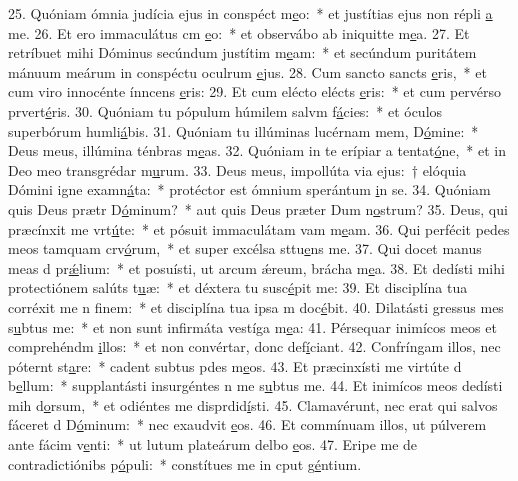 25. Quóniam ómnia judícia ejus in conspéct m\uline{e}o:~* et justítias ejus non répli \uline{a} me.
26. Et ero immaculátus cm \uline{e}o:~* et observábo ab iniquitte m\uline{e}a.
27. Et retríbuet mihi Dóminus secúndum justítim m\uline{e}am:~* et secúndum puritátem mánuum meárum in conspéctu oculrum \uline{e}jus.
28. Cum sancto sancts \uline{e}ris,~* et cum viro innocénte ínncens \uline{e}ris:
29. Et cum elécto elécts \uline{e}ris:~* et cum pervérso prvert\uline{é}ris.
30. Quóniam tu pópulum húmilem salvm f\uline{á}cies:~* et óculos superbórum humli\uline{á}bis.
31. Quóniam tu illúminas lucérnam mem, D\uline{ó}mine:~* Deus meus, illúmina ténbras m\uline{e}as.
32. Quóniam in te erípiar a tentat\uline{ó}ne,~* et in Deo meo transgrédar m\uline{u}rum.
33. Deus meus, impollúta via ejus:~† elóquia Dómini igne examn\uline{á}ta:~* protéctor est ómnium sperántum \uline{i}n se.
34. Quóniam quis Deus prætr D\uline{ó}minum?~* aut quis Deus præter Dum n\uline{o}strum?
35. Deus, qui præcínxit me vrt\uline{ú}te:~* et pósuit immaculátam vam m\uline{e}am.
36. Qui perfécit pedes meos tamquam crv\uline{ó}rum,~* et super excélsa sttu\uline{e}ns me.
37. Qui docet manus meas d pr\uline{ǽ}lium:~* et posuísti, ut arcum ǽreum, brácha m\uline{e}a.
38. Et dedísti mihi protectiónem salúts t\uline{u}æ:~* et déxtera tu susc\uline{é}pit me:
39. Et disciplína tua corréxit me n f\uline{i}nem:~* et disciplína tua ipsa m doc\uline{é}bit.
40. Dilatásti gressus mes s\uline{u}btus me:~* et non sunt infirmáta vestíga m\uline{e}a:
41. Pérsequar inimícos meos et comprehéndm \uline{i}llos:~* et non convértar, donc def\uline{í}ciant.
42. Confríngam illos, nec póternt st\uline{a}re:~* cadent subtus pdes m\uline{e}os.
43. Et præcinxísti me virtúte d b\uline{e}llum:~* supplantásti insurgéntes n me s\uline{u}btus me.
44. Et inimícos meos dedísti mih d\uline{o}rsum,~* et odiéntes me disprdid\uline{í}sti.
45. Clamavérunt, nec erat qui salvos fáceret d D\uline{ó}minum:~* nec exaudvit \uline{e}os.
46. Et commínuam illos, ut púlverem ante fácim v\uline{e}nti:~* ut lutum plateárum delbo \uline{e}os.
47. Eripe me de contradictiónibs p\uline{ó}puli:~* constítues me in cput g\uline{é}ntium.
